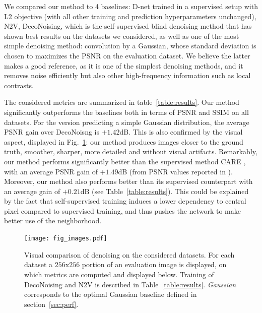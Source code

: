 \documentclass{article}
\begin{document}
We compared our method to 4 baselines: D-net trained in a supervised setup with L2 objective (with all other training and prediction hyperparameters unchanged), N2V, DecoNoising, which is the self-supervised blind denoising method that has shown best results on the datasets we considered, as well as one of the most simple denoising method: convolution by a Gaussian, whose standard deviation is chosen to maximizes the PSNR on the evaluation dataset.
We believe the latter makes a good reference, as it is one of the simplest denoising methods, and it removes noise efficiently but also other high-frequency information such as local contrasts.

The considered metrics are summarized in table~\ref{table:results}.
Our method significantly outperforms the baselines both in terms of PSNR and SSIM on all datasets.
For the version predicting a simple Gaussian distribution, the average PSNR gain over DecoNoisng is $+1.42$dB.
This is also confirmed by the visual aspect, displayed in Fig.~\ref{fig:images}: our method produces images closer to the ground truth, smoother, sharper, more detailed and without visual artifacts.
Remarkably, our method performs significantly better than the supervised method CARE \cite{weigert2017content}, with an average PSNR gain of $+1.49$dB (from PSNR values reported in \cite{goncharova2020}).
Moreover, our method also performs better than its supervised counterpart with an average gain of $+0.21$dB (see Table~\ref{table:results}).
This could be explained by the fact that self-supervised training induces a lower dependency to central pixel compared to supervised training, and thus pushes the network to make better use of the neighborhood.

\begin{figure}[!htbp]
\vskip -0.1in
\texttt{[image: fig\_images.pdf]}
\caption{Visual comparison of denoising on the considered datasets. For each dataset a $256$x$256$ portion of an evaluation image is displayed, on which metrics are computed and displayed below. Training of DecoNoising and N2V is described in Table~\ref{table:results}. \textit{Gaussian} corresponds to the optimal Gaussian baseline defined in section~\ref{sec:perf}.}
\label{fig:images}
\end{figure}
\end{document}
